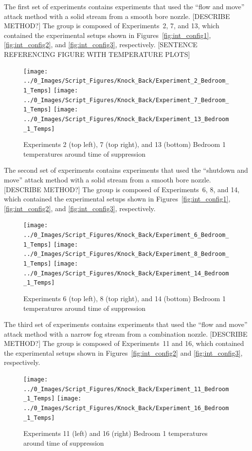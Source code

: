 \documentclass[12pt,oneside]{book}
\begin{document}
The first set of experiments contains experiments that used the ``flow and move'' attack method with a solid stream from a smooth bore nozzle. [DESCRIBE METHOD?] The group is composed of Experiments~2, 7, and 13, which contained the experimental setups shown in Figures~\ref{fig:int_config1}, \ref{fig:int_config2}, and \ref{fig:int_config3}, respectively. [SENTENCE REFERENCING FIGURE WITH TEMPERATURE PLOTS]

\begin{figure}[H]
	\centering
	\texttt{[image: ../0\_Images/Script\_Figures/Knock\_Back/Experiment\_2\_Bedroom\_1\_Temps]}
	\texttt{[image: ../0\_Images/Script\_Figures/Knock\_Back/Experiment\_7\_Bedroom\_1\_Temps]}
	\texttt{[image: ../0\_Images/Script\_Figures/Knock\_Back/Experiment\_13\_Bedroom\_1\_Temps]}
	\caption[]{Experiments 2 (top left), 7 (top right), and 13 (bottom) Bedroom 1 temperatures around time of suppression}
	\label{fig:knockback_int_1}
\end{figure}
\clearpage

The second set of experiments contains experiments that used the ``shutdown and move'' attack method with a solid stream from a smooth bore nozzle. [DESCRIBE METHOD?] The group is composed of Experiments~6, 8, and 14, which contained the experimental setups shown in Figures~\ref{fig:int_config1}, \ref{fig:int_config2}, and \ref{fig:int_config3}, respectively.

\begin{figure}[!ht]
	\centering
	\texttt{[image: ../0\_Images/Script\_Figures/Knock\_Back/Experiment\_6\_Bedroom\_1\_Temps]}
	\texttt{[image: ../0\_Images/Script\_Figures/Knock\_Back/Experiment\_8\_Bedroom\_1\_Temps]}
	\texttt{[image: ../0\_Images/Script\_Figures/Knock\_Back/Experiment\_14\_Bedroom\_1\_Temps]}
	\caption[]{Experiments 6 (top left), 8 (top right), and 14 (bottom) Bedroom 1 temperatures around time of suppression}
	\label{fig:knockback_int_2}
\end{figure}
\clearpage

The third set of experiments contains experiments that used the ``flow and move'' attack method with a narrow fog stream from a combination nozzle. [DESCRIBE METHOD?] The group is composed of Experiments~11 and 16, which contained the experimental setups shown in Figures~\ref{fig:int_config2} and \ref{fig:int_config3}, respectively.

\begin{figure}[H]
	\centering
	\texttt{[image: ../0\_Images/Script\_Figures/Knock\_Back/Experiment\_11\_Bedroom\_1\_Temps]}
	\texttt{[image: ../0\_Images/Script\_Figures/Knock\_Back/Experiment\_16\_Bedroom\_1\_Temps]}
	\caption[]{Experiments 11 (left) and 16 (right) Bedroom 1 temperatures around time of suppression}
	\label{fig:knockback_int_3}
\end{figure}
\clearpage
\end{document}
